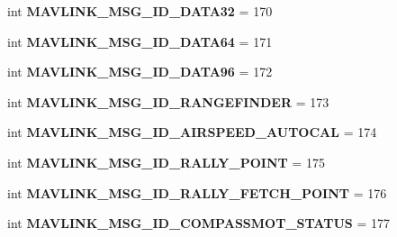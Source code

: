 \begin{DoxyCompactItemize}
\item 
\mbox{\label{namespacepymavlink_1_1dialects_1_1v10_acf04ab2beda6e81019fcf63515594148}} 
int {\bfseries M\+A\+V\+L\+I\+N\+K\+\_\+\+M\+S\+G\+\_\+\+I\+D\+\_\+\+D\+A\+T\+A32} = 170
\item 
\mbox{\label{namespacepymavlink_1_1dialects_1_1v10_a403b393dc193b1792b99c2d1bba64665}} 
int {\bfseries M\+A\+V\+L\+I\+N\+K\+\_\+\+M\+S\+G\+\_\+\+I\+D\+\_\+\+D\+A\+T\+A64} = 171
\item 
\mbox{\label{namespacepymavlink_1_1dialects_1_1v10_a36a825dc97a78ca72527c2e63b82a762}} 
int {\bfseries M\+A\+V\+L\+I\+N\+K\+\_\+\+M\+S\+G\+\_\+\+I\+D\+\_\+\+D\+A\+T\+A96} = 172
\item 
\mbox{\label{namespacepymavlink_1_1dialects_1_1v10_a3b09e097411bb4975b5df2b90f482c02}} 
int {\bfseries M\+A\+V\+L\+I\+N\+K\+\_\+\+M\+S\+G\+\_\+\+I\+D\+\_\+\+R\+A\+N\+G\+E\+F\+I\+N\+D\+ER} = 173
\item 
\mbox{\label{namespacepymavlink_1_1dialects_1_1v10_a1b2ce4396fd64560642a2b87aa545ce1}} 
int {\bfseries M\+A\+V\+L\+I\+N\+K\+\_\+\+M\+S\+G\+\_\+\+I\+D\+\_\+\+A\+I\+R\+S\+P\+E\+E\+D\+\_\+\+A\+U\+T\+O\+C\+AL} = 174
\item 
\mbox{\label{namespacepymavlink_1_1dialects_1_1v10_acf215afb5381011571ed783fb0e91f6e}} 
int {\bfseries M\+A\+V\+L\+I\+N\+K\+\_\+\+M\+S\+G\+\_\+\+I\+D\+\_\+\+R\+A\+L\+L\+Y\+\_\+\+P\+O\+I\+NT} = 175
\item 
\mbox{\label{namespacepymavlink_1_1dialects_1_1v10_ae162a234e71ca768e5f4526d5f6c82d3}} 
int {\bfseries M\+A\+V\+L\+I\+N\+K\+\_\+\+M\+S\+G\+\_\+\+I\+D\+\_\+\+R\+A\+L\+L\+Y\+\_\+\+F\+E\+T\+C\+H\+\_\+\+P\+O\+I\+NT} = 176
\item 
\mbox{\label{namespacepymavlink_1_1dialects_1_1v10_a3dd06b174ffa34b61e7eed033f6ea112}} 
int {\bfseries M\+A\+V\+L\+I\+N\+K\+\_\+\+M\+S\+G\+\_\+\+I\+D\+\_\+\+C\+O\+M\+P\+A\+S\+S\+M\+O\+T\+\_\+\+S\+T\+A\+T\+US} = 177

\end{DoxyCompactItemize}
